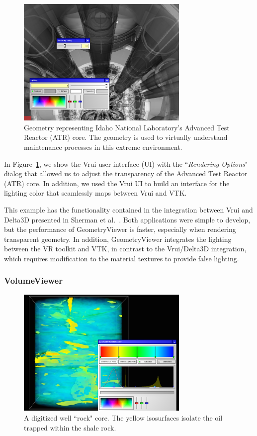 \begin{figure}[h!]
 \centering
 \includegraphics[width=3.25in]{images/vessel.png}
 \caption{Geometry representing Idaho National Laboratory's Advanced Test Reactor (ATR) core. The geometry is used to virtually understand maintenance processes in this extreme environment.}
 \label{fig:vessel}
\end{figure}

In Figure~\ref{fig:vessel}, we show the Vrui user interface (UI) with the ``\textit{Rendering Options}" dialog that allowed us to adjust the transparency of the Advanced Test Reactor (ATR) core. In addition, we used the Vrui UI to build an interface for the lighting color that seamlessly maps between Vrui and VTK.

This example has the functionality contained in the integration between Vrui and Delta3D presented in Sherman et al.~\cite{Sherman:2010}. Both applications were simple to develop, but the performance of GeometryViewer is faster, especially when rendering transparent geometry. In addition, GeometryViewer integrates the lighting between the VR toolkit and VTK, in contrast to the Vrui/Delta3D integration, which requires modification to the material textures to provide false lighting.

\subsubsection{VolumeViewer}

\begin{figure}[h!]
 \centering
 \includegraphics[width=3.25in]{images/rock-transferfunction.png}
 \caption{A digitized well ``rock" core. The yellow isosurfaces isolate the oil trapped within the shale rock.}
 \label{fig:volume}
\end{figure}

